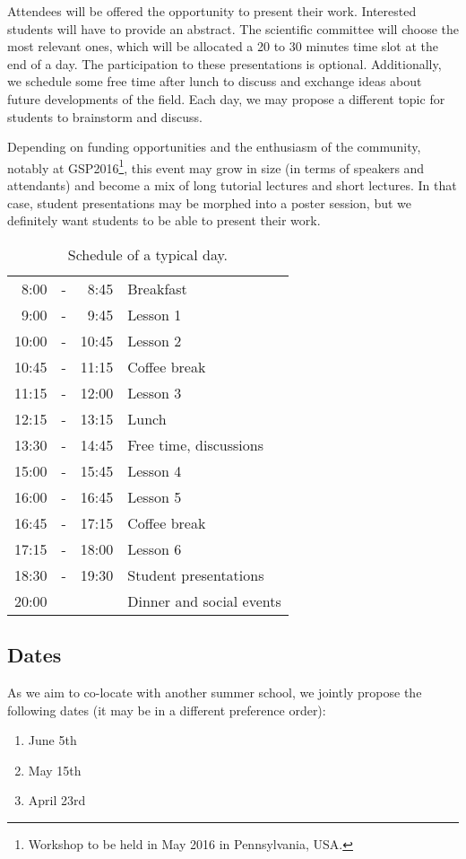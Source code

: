 \documentclass[a4paper]{scrartcl}
\begin{document}
Attendees will be offered the opportunity to present their work. Interested
students will have to provide an abstract. The scientific committee will choose
the most relevant ones, which will be allocated a 20 to 30 minutes time slot at
the end of a day. The participation to these presentations is optional.
Additionally, we schedule some free time after lunch to discuss and exchange
ideas about future developments of the field. Each day, we may propose a
different topic for students to brainstorm and discuss.

Depending on funding opportunities and the enthusiasm of the community, notably
at GSP2016\footnote{Workshop to be held in May 2016 in Pennsylvania, USA.}, this
event may grow in size (in terms of speakers and attendants) and become a mix of
long tutorial lectures and short lectures. In that case, student presentations
may be morphed into a poster session, but we definitely want students to be able
to present their work.

\begin{table}[ht]
	\centering
	\begin{tabular}{rcrl}
	 8:00 & - &  8:45 & Breakfast \\
	 9:00 & - &  9:45 & Lesson 1 \\
	10:00 & - & 10:45 & Lesson 2 \\
	10:45 & - & 11:15 & Coffee break \\
	11:15 & - & 12:00 & Lesson 3 \\
	12:15 & - & 13:15 & Lunch \\
	13:30 & - & 14:45 & Free time, discussions \\
	15:00 & - & 15:45 & Lesson 4 \\
	16:00 & - & 16:45 & Lesson 5 \\
	16:45 & - & 17:15 & Coffee break \\
	17:15 & - & 18:00 & Lesson 6 \\
	18:30 & - & 19:30 & Student presentations \\
	20:00 &   &       & Dinner and social events
	\end{tabular}
	\caption{Schedule of a typical day.}
	\label{schedule}
\end{table}

\subsection{Dates}

As we aim to co-locate with another summer school, we jointly propose the
following dates (it may be in a different preference order):
\begin{enumerate}
	\setlength{\itemsep}{0pt} \setlength{\parskip}{0pt}
	\item June 5th
	\item May 15th
	\item April 23rd
\end{enumerate}
\end{document}

